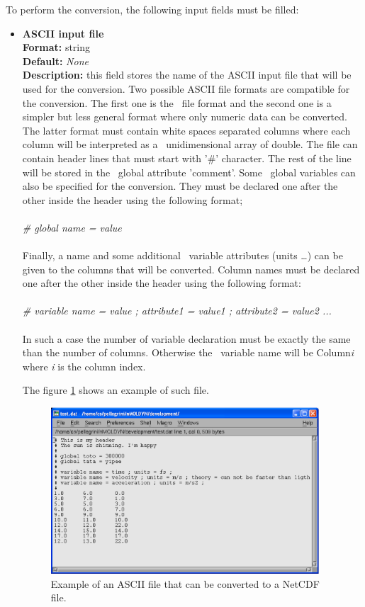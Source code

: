 \documentclass[a4paper,11pt]{report}
\begin{document}
To perform the conversion, the following input fields must be filled:
\hypertarget{convert_ascii_to_netcdf_ascii_input_file}{}
\begin{itemize}
\item \textbf{ASCII input file}\\
\textbf{Format:} string\\
\textbf{Default:} \textit{None}\\
\textbf{Description:} this field stores the name of the ASCII input file that will be used for the conversion. Two possible 
ASCII file formats are compatible for the conversion. The first one is the \CDL\ file format \cite{CDL} and the second one is 
a simpler but less general format where only numeric data can be converted. The latter format must contain white spaces separated columns where 
each column will be interpreted as a \NetCDF\ unidimensional array of double. The file can contain header lines that must 
start with '\#' character. The rest of the line will be stored in the \NetCDF\ global attribute 'comment'. 
Some \NetCDF\ global variables can also be specified for the conversion. They must be declared one after the other inside 
the header using the following format;
\\\\
\textit{\# global name = value}
\\\\
Finally, a name and some additional \NetCDF\ variable attributes (units \ldots ) can be given to the columns that will 
be converted. Column names must be declared one after the other inside the header using the following format:
\\\\
\textit{\# variable name = value ; attribute1 = value1 ; attribute2 = value2 ...}
\\\\
In such a case the number of variable declaration must be exactly the same than the number of columns. Otherwise the 
\NetCDF\ variable name will be Column\textit{i} where \textit{i} is the column index.

The figure \ref{fig:convert_ascii_netcdf_example} shows an example of such file.
\newpage
\begin{figure}[h!]
\begin{center}
\includegraphics[width=10cm]{Figures/convert_ascii_netcdf_example.eps}
\end{center}
\caption[Example of an ASCII file that can be converted to a NetCDF file]{Example of an ASCII file that can be converted to a NetCDF file.}
\label{fig:convert_ascii_netcdf_example}
\end{figure}   


\end{itemize}
\end{document}
